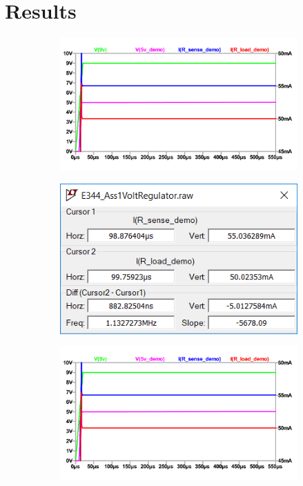 \chapter{Results}\label{ch:results}


\begin{figure}
 \footnotesize
 \centering
    \begin{subfigure}[]{0.55\textwidth}
              \centering
  		\includegraphics[width=1\linewidth]{./Figures/E344_VoltRegulator.pdf}
		    \caption{} \label{subfig:pwr_simu_rect}
     \end{subfigure}
     \begin{subfigure}[]{0.4\textwidth}
             \centering
  		\includegraphics[width=1.0\linewidth]{./Figures/Screengrab2}
		   \caption{ } \label{subfig:pwr_meas_rect}
     \end{subfigure}
    \begin{subfigure}[]{0.55\textwidth}
              \centering
  		\includegraphics[width=1\linewidth]{./Figures/E344_VoltRegulator.pdf}

\end{subfigure}
\end{figure}
